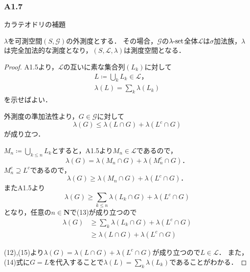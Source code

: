 \documentclass{jsarticle}
\begin{document}
\subsubsection*{A1.7}
カラテオドリの補題

$\lambda$を可測空間$(S,\mathcal{G})$の外測度とする．
その場合，$\mathcal{G}$の$\lambda{\rm \text{-}set}$全体$\mathcal{L}$は$\sigma$加法族，$\lambda$は完全加法的な測度となり，$(S,\mathcal{L},\lambda)$は測度空間となる．

\begin{proof}
    A1.5より，$\mathcal{L}$の互いに素な集合列$(L_k)$に対して
    \begin{align}
        L\coloneqq \bigcup_k L_k\in\mathcal{L} ， \nonumber \\
        \lambda(L)=\sum_k \lambda(L_k) \nonumber
    \end{align}
    を示せばよい．

    外測度の準加法性より，$G\in\mathcal{G}$に対して
    \begin{equation}
        \lambda(G) \leq  \lambda(L\cap G)+\lambda(L^c\cap G) 
    \end{equation}
    が成り立つ．

    $M_n\coloneqq \bigcup_{k\leq n}L_k$とすると，A1.5より$M_n\in\mathcal{L}$であるので，
    \begin{equation}
        \lambda(G)=\lambda(M_n\cap G)+\lambda(M_n^c\cap G) ． \nonumber
    \end{equation}
    $M_n^c\supseteq L^c$であるので，
    \begin{equation}
        \lambda(G)\geq\lambda(M_n\cap G)+\lambda(L^c\cap G) ． \nonumber
    \end{equation}
    またA1.5より
    \begin{equation}
        \lambda(G) \geq \sum_{k\leq n}\lambda(L_k\cap G)+\lambda(L^c\cap G) 
    \end{equation}
    となり，任意の$n\in\mathbf{N}$で(13)が成り立つので
    \begin{align}
        \lambda(G) &\geq \sum_{k}\lambda(L_k\cap G)+\lambda(L^c\cap G)  \\
        &\geq \lambda(L\cap G)+\lambda(L^c\cap G)
    \end{align}

    (12),(15)より$\lambda(G)=\lambda(L\cap G)+\lambda(L^c\cap G)$が成り立つので$L\in\mathcal{L}$．
    また，(14)式に$G=L$を代入することで$\lambda(L)=\sum_k \lambda(L_k)$であることがわかる． 
\end{proof}
\end{document}
